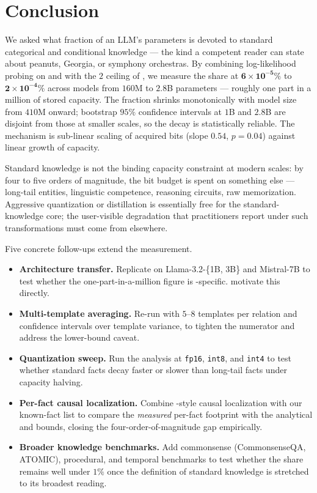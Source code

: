 \section{Conclusion}
\label{sec:conclusion}

We asked what fraction of an LLM's parameters is devoted to standard categorical and conditional knowledge --- the kind a competent reader can state about peanuts, Georgia, or symphony orchestras. By combining log-likelihood probing on \bear and \taxi with the \(2\) \bpp ceiling of \citet{allenzhu2024knowledge}, we measure the share at \(\mathbf{6 \times 10^{-5}\%}\) to \(\mathbf{2 \times 10^{-4}\%}\) across \pythia models from \(160\)M to \(2.8\)B parameters --- roughly one part in a million of stored capacity. The fraction shrinks monotonically with model size from \(410\)M onward; bootstrap \(95\%\) confidence intervals at \(1\)B and \(2.8\)B are disjoint from those at smaller scales, so the decay is statistically reliable. The mechanism is sub-linear scaling of acquired bits (\bear slope \(0.54\), \(p = 0.04\)) against linear growth of capacity.

 Standard knowledge is not the binding capacity constraint at modern scales: by four to five orders of magnitude, the bit budget is spent on something else --- long-tail entities, linguistic competence, reasoning circuits, raw memorization. Aggressive quantization or distillation is essentially free for the standard-knowledge core; the user-visible degradation that practitioners report under such transformations must come from elsewhere.

 Five concrete follow-ups extend the measurement.
\begin{itemize}[leftmargin=*,itemsep=0pt,topsep=0pt]
    \item \textbf{Architecture transfer.} Replicate on Llama-3.2-\{1B, 3B\} and Mistral-7B to test whether the one-part-in-a-million figure is \pythia-specific. \citet{hong2025specialization} motivate this directly.
    \item \textbf{Multi-template averaging.} Re-run with \(5\)--\(8\) templates per \bear relation and confidence intervals over template variance, to tighten the numerator and address the lower-bound caveat.
    \item \textbf{Quantization sweep.} Run the analysis at \texttt{fp16}, \texttt{int8}, and \texttt{int4} to test whether standard facts decay faster or slower than long-tail facts under capacity halving.
    \item \textbf{Per-fact causal localization.} Combine \rome-style causal localization with our known-fact list to compare the \emph{measured} per-fact footprint with the analytical \kn and \rome bounds, closing the four-order-of-magnitude gap empirically.
    \item \textbf{Broader knowledge benchmarks.} Add commonsense (CommonsenseQA, ATOMIC), procedural, and temporal benchmarks to test whether the share remains well under \(1\%\) once the definition of standard knowledge is stretched to its broadest reading.
\end{itemize}

